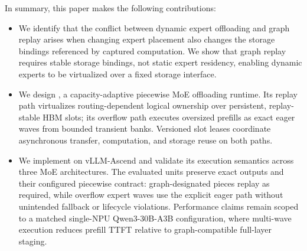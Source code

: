 In summary, this paper makes the following contributions:

\begin{itemize}

\item We identify that the conflict between dynamic expert offloading and graph replay arises when changing expert placement also changes the storage bindings referenced by captured computation. We show that graph replay requires stable storage bindings, not static expert residency, enabling dynamic experts to be virtualized over a fixed storage interface.

\item We design \system, a capacity-adaptive piecewise MoE offloading runtime.
Its replay path virtualizes routing-dependent logical ownership over persistent,
replay-stable HBM slots; its overflow path executes oversized prefills as exact
eager waves from bounded transient banks. Versioned slot leases coordinate
asynchronous transfer, computation, and storage reuse on both paths.

\item We implement \system on vLLM-Ascend and validate its execution semantics
across three MoE architectures. The evaluated units preserve exact outputs and
their configured piecewise contract: graph-designated pieces replay as required,
while overflow expert waves use the explicit eager path without unintended
fallback or lifecycle violations.
Performance claims remain scoped to a matched single-NPU Qwen3-30B-A3B
configuration, where multi-wave execution reduces prefill TTFT relative to
graph-compatible full-layer staging.

\end{itemize}
